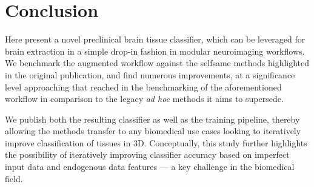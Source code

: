 \documentclass[11pt, english]{article}
\begin{document}
    \section{Conclusion}
    Here present a novel preclinical brain tissue classifier, which can be leveraged for brain extraction in a simple drop-in fashion in modular neuroimaging workflows.
    We benchmark the augmented workflow against the selfsame methods highlighted in the original publication, and find numerous improvements, at a significance level approaching that reached in the benchmarking of the aforementioned workflow in comparison to the legacy \textit{ad hoc} methods it aims to supersede.

    We publish both the resulting classifier as well as the training pipeline, thereby allowing the methods transfer to any biomedical use cases looking to iteratively improve classification of tissues in 3D.
    Conceptually, this study further highlights the possibility of iteratively improving classifier accuracy based on imperfect input data and endogenous data features --- a key challenge in the biomedical field.




    \clearpage
    \printbibliography
\end{document}
